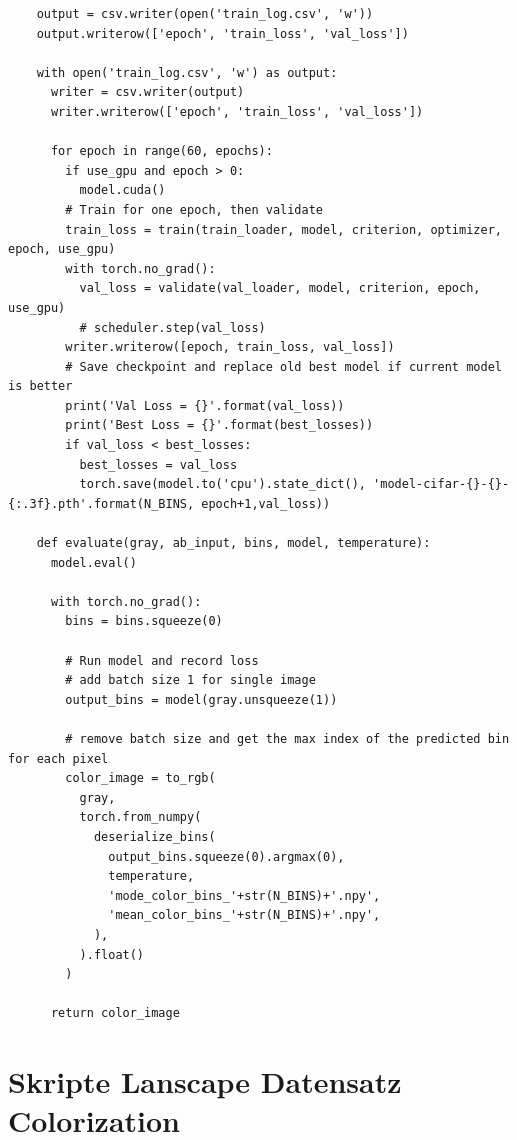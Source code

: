 \begin{longlisting}
\begin{verbatim}
    output = csv.writer(open('train_log.csv', 'w'))
    output.writerow(['epoch', 'train_loss', 'val_loss'])

    with open('train_log.csv', 'w') as output:
      writer = csv.writer(output)
      writer.writerow(['epoch', 'train_loss', 'val_loss'])

      for epoch in range(60, epochs):
        if use_gpu and epoch > 0:
          model.cuda()
        # Train for one epoch, then validate
        train_loss = train(train_loader, model, criterion, optimizer, epoch, use_gpu)
        with torch.no_grad():
          val_loss = validate(val_loader, model, criterion, epoch, use_gpu)
          # scheduler.step(val_loss)
        writer.writerow([epoch, train_loss, val_loss])
        # Save checkpoint and replace old best model if current model is better
        print('Val Loss = {}'.format(val_loss))
        print('Best Loss = {}'.format(best_losses))
        if val_loss < best_losses:
          best_losses = val_loss
          torch.save(model.to('cpu').state_dict(), 'model-cifar-{}-{}-{:.3f}.pth'.format(N_BINS, epoch+1,val_loss))

    def evaluate(gray, ab_input, bins, model, temperature):
      model.eval()

      with torch.no_grad():
        bins = bins.squeeze(0)

        # Run model and record loss
        # add batch size 1 for single image
        output_bins = model(gray.unsqueeze(1))
        
        # remove batch size and get the max index of the predicted bin for each pixel
        color_image = to_rgb(
          gray,
          torch.from_numpy(
            deserialize_bins(
              output_bins.squeeze(0).argmax(0),
              temperature,
              'mode_color_bins_'+str(N_BINS)+'.npy',
              'mean_color_bins_'+str(N_BINS)+'.npy',
            ),
          ).float()
        )

      return color_image
  \end{verbatim}
\end{longlisting}

\section{Skripte Lanscape Datensatz Colorization}
